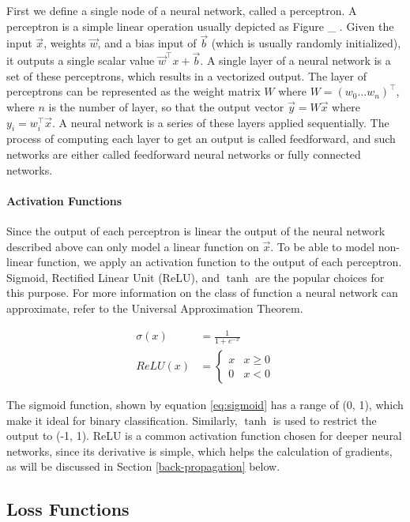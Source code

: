 \documentclass[12pt,a4paper,]{report}
\begin{document}
First we define a single node of a neural network, called a perceptron.
A perceptron is a simple linear operation usually depicted as Figure \_
. Given the input \(\vec{x}\), weights \(\vec{w}\), and a bias input of
\(\vec{b}\) (which is usually randomly initialized), it outputs a single
scalar value \(\vec{w}^\intercal x + \vec{b}\). A single layer of a
neural network is a set of these perceptrons, which results in a
vectorized output. The layer of perceptrons can be represented as the
weight matrix \(W\) where \(W = (w_0 ... w_n)^\intercal\), where \(n\)
is the number of layer, so that the output vector
\(\vec{y} = W \vec{x}\) where \(y_i = w_i^\intercal \vec{x}\). A neural
network is a series of these layers applied sequentially. The process of
computing each layer to get an output is called feedforward, and such
networks are either called feedforward neural networks or fully
connected networks.

\paragraph{Activation Functions}

Since the output of each perceptron is linear the output of the neural
network described above can only model a linear function on \(\vec{x}\).
To be able to model non-linear function, we apply an activation function
to the output of each perceptron. Sigmoid, Rectified Linear Unit (ReLU),
and \(\tanh\) are the popular choices for this purpose. For more
information on the class of function a neural network can approximate,
refer to the Universal Approximation Theorem.

\begin{align}
    \sigma(x) &= \frac{1}{1 + e^{-x}} \label{eq:sigmoid} \\
    ReLU(x) &= \begin{cases}
        x & x \geq 0 \\
        0 & x < 0
    \end{cases} 
\end{align}

The sigmoid function, shown by equation \ref{eq:sigmoid} has a range of
(0, 1), which make it ideal for binary classification. Similarly,
\(\tanh\) is used to restrict the output to (-1, 1). ReLU is a common
activation function chosen for deeper neural networks, since its
derivative is simple, which helps the calculation of gradients, as will
be discussed in Section \ref{back-propagation} below.

\hypertarget{loss-functions}{%
\subsection{Loss Functions}\label{loss-functions}}
\end{document}
